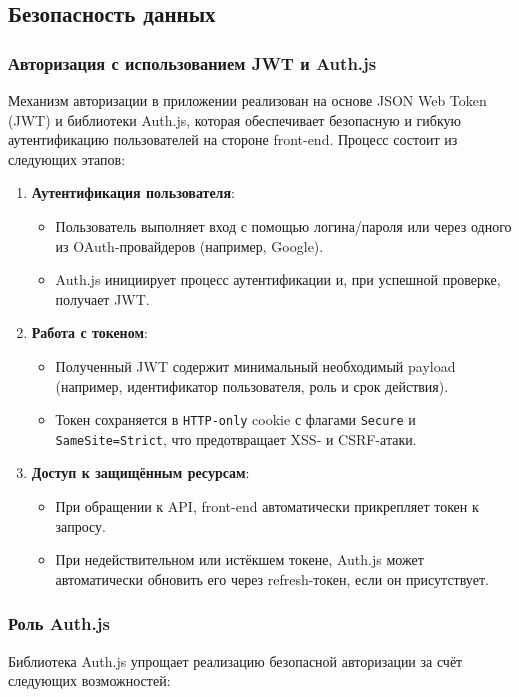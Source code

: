 \subsection{Безопасность данных}
\subsubsection{Авторизация с использованием JWT и Auth.js}
Механизм авторизации в приложении реализован на основе JSON Web Token (JWT) и библиотеки Auth.js, которая обеспечивает безопасную и гибкую аутентификацию пользователей на стороне front-end. Процесс состоит из следующих этапов:

\begin{enumerate}
    \item \textbf{Аутентификация пользователя}:
    \begin{itemize}
        \item Пользователь выполняет вход с помощью логина/пароля или через одного из OAuth-провайдеров (например, Google).
        \item Auth.js инициирует процесс аутентификации и, при успешной проверке, получает JWT.
    \end{itemize}

    \item \textbf{Работа с токеном}:
    \begin{itemize}
        \item Полученный JWT содержит минимальный необходимый payload (например, идентификатор пользователя, роль и срок действия).
        \item Токен сохраняется в \texttt{HTTP-only} cookie с флагами \texttt{Secure} и \texttt{SameSite=Strict}, что предотвращает XSS- и CSRF-атаки.
    \end{itemize}

    \item \textbf{Доступ к защищённым ресурсам}:
    \begin{itemize}
        \item При обращении к API, front-end автоматически прикрепляет токен к запросу.
        \item При недействительном или истёкшем токене, Auth.js может автоматически обновить его через refresh-токен, если он присутствует.
    \end{itemize}
\end{enumerate}

\subsubsection{Роль Auth.js}
Библиотека Auth.js упрощает реализацию безопасной авторизации за счёт следующих возможностей:

